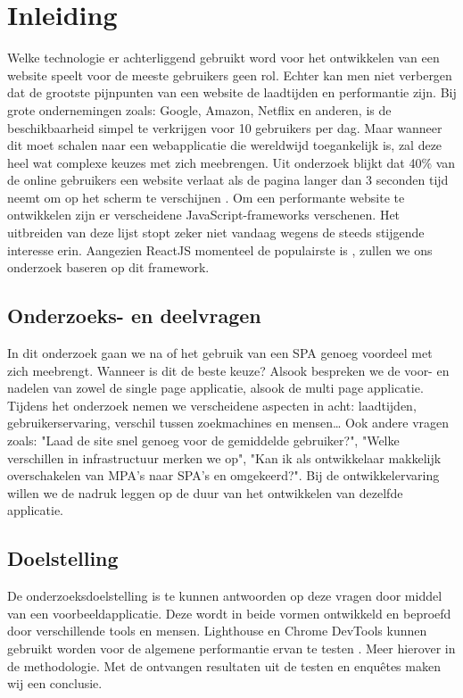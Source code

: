 \documentclass{hogent-article}
\affiliation{
  \textsuperscript{1} \href{mailto:jens.penneman@student.hogent.be}{jens.penneman@student.hogent.be}}
\begin{document}
\flushbottom
\maketitle
\tableofcontents
\thispagestyle{empty}


\section{Inleiding}
Welke technologie er achterliggend gebruikt word voor het ontwikkelen van een website speelt voor de meeste gebruikers geen rol.
Echter kan men niet verbergen dat de grootste pijnpunten van een website de laadtijden en performantie zijn.
Bij grote ondernemingen zoals: Google, Amazon, Netflix en anderen, is de beschikbaarheid simpel te verkrijgen voor 10 gebruikers per dag.
Maar wanneer dit moet schalen naar een webapplicatie die wereldwijd toegankelijk is, zal deze heel wat complexe keuzes met zich meebrengen.
Uit onderzoek blijkt dat 40\% van de online gebruikers een website verlaat als de pagina langer dan 3 seconden tijd neemt om op het scherm te verschijnen \autocite{LoadingSpeedWedevs2021}.
Om een performante website te ontwikkelen zijn er verscheidene JavaScript-frameworks verschenen. Het uitbreiden van deze lijst stopt zeker niet vandaag wegens de steeds stijgende interesse erin.
Aangezien ReactJS momenteel de populairste is \autocite{Gathoni2022}, zullen we ons onderzoek baseren op dit framework. 

\subsection{Onderzoeks- en deelvragen}
In dit onderzoek gaan we na of het gebruik van een SPA genoeg voordeel met zich meebrengt.
Wanneer is dit de beste keuze?
Alsook bespreken we de voor- en nadelen van zowel de single page applicatie, alsook de multi page applicatie.
Tijdens het onderzoek nemen we verscheidene aspecten in acht:
laadtijden,
gebruikerservaring,
verschil tussen zoekmachines en mensen\dots
Ook andere vragen zoals:
"Laad de site snel genoeg voor de gemiddelde gebruiker?",
"Welke verschillen in infrastructuur merken we op",
"Kan ik als ontwikkelaar makkelijk overschakelen van MPA's naar SPA's en omgekeerd?".
Bij de ontwikkelervaring willen we de nadruk leggen op de duur van het ontwikkelen van dezelfde applicatie.

\subsection{Doelstelling}
De onderzoeksdoelstelling is te kunnen antwoorden op deze vragen door middel van een voorbeeldapplicatie.
Deze wordt in beide vormen ontwikkeld en beproefd door verschillende tools en mensen.
Lighthouse en Chrome DevTools kunnen gebruikt worden voor de algemene performantie ervan te testen \autocite{Demian2022}.
Meer hierover in de methodologie.
Met de ontvangen resultaten uit de testen en enquêtes maken wij een conclusie.
\end{document}
